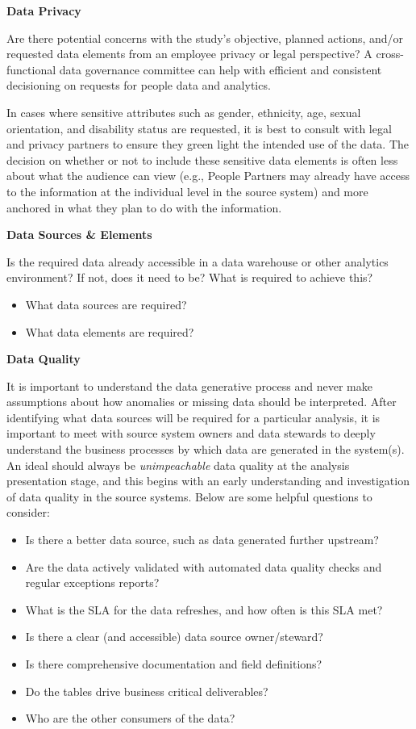 \documentclass[
]{book}
\providecommand{\tightlist}{%
  \setlength{\itemsep}{0pt}\setlength{\parskip}{0pt}}
\begin{document}
\textbf{Data Privacy}

Are there potential concerns with the study's objective, planned actions, and/or requested data elements from an employee privacy or legal perspective? A cross-functional data governance committee can help with efficient and consistent decisioning on requests for people data and analytics.

In cases where sensitive attributes such as gender, ethnicity, age, sexual orientation, and disability status are requested, it is best to consult with legal and privacy partners to ensure they green light the intended use of the data. The decision on whether or not to include these sensitive data elements is often less about what the audience can view (e.g., People Partners may already have access to the information at the individual level in the source system) and more anchored in what they plan to do with the information.

\textbf{Data Sources \& Elements}

Is the required data already accessible in a data warehouse or other analytics environment? If not, does it need to be? What is required to achieve this?

\begin{itemize}
\tightlist
\item
  What data sources are required?
\item
  What data elements are required?
\end{itemize}

\textbf{Data Quality}

It is important to understand the data generative process and never make assumptions about how anomalies or missing data should be interpreted. After identifying what data sources will be required for a particular analysis, it is important to meet with source system owners and data stewards to deeply understand the business processes by which data are generated in the system(s). An ideal should always be \emph{unimpeachable} data quality at the analysis presentation stage, and this begins with an early understanding and investigation of data quality in the source systems. Below are some helpful questions to consider:

\begin{itemize}
\tightlist
\item
  Is there a better data source, such as data generated further upstream?
\item
  Are the data actively validated with automated data quality checks and regular exceptions reports?
\item
  What is the SLA for the data refreshes, and how often is this SLA met?
\item
  Is there a clear (and accessible) data source owner/steward?
\item
  Is there comprehensive documentation and field definitions?
\item
  Do the tables drive business critical deliverables?
\item
  Who are the other consumers of the data?
\end{itemize}
\end{document}
